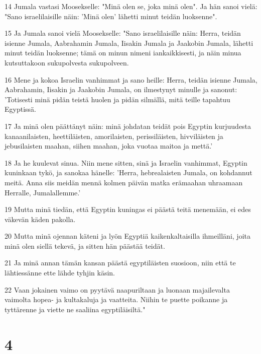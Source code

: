 \par 14 Jumala vastasi Moosekselle: "Minä olen se, joka minä olen". Ja hän sanoi vielä: "Sano israelilaisille näin: 'Minä olen' lähetti minut teidän luoksenne".
\par 15 Ja Jumala sanoi vielä Moosekselle: "Sano israelilaisille näin: Herra, teidän isienne Jumala, Aabrahamin Jumala, Iisakin Jumala ja Jaakobin Jumala, lähetti minut teidän luoksenne; tämä on minun nimeni iankaikkisesti, ja näin minua kutsuttakoon sukupolvesta sukupolveen.
\par 16 Mene ja kokoa Israelin vanhimmat ja sano heille: Herra, teidän isienne Jumala, Aabrahamin, Iisakin ja Jaakobin Jumala, on ilmestynyt minulle ja sanonut: 'Totisesti minä pidän teistä huolen ja pidän silmällä, mitä teille tapahtuu Egyptissä.
\par 17 Ja minä olen päättänyt näin: minä johdatan teidät pois Egyptin kurjuudesta kanaanilaisten, heettiläisten, amorilaisten, perissiläisten, hivviläisten ja jebusilaisten maahan, siihen maahan, joka vuotaa maitoa ja mettä.'
\par 18 Ja he kuulevat sinua. Niin mene sitten, sinä ja Israelin vanhimmat, Egyptin kuninkaan tykö, ja sanokaa hänelle: 'Herra, hebrealaisten Jumala, on kohdannut meitä. Anna siis meidän mennä kolmen päivän matka erämaahan uhraamaan Herralle, Jumalallemme.'
\par 19 Mutta minä tiedän, että Egyptin kuningas ei päästä teitä menemään, ei edes väkevän käden pakolla.
\par 20 Mutta minä ojennan käteni ja lyön Egyptiä kaikenkaltaisilla ihmeilläni, joita minä olen siellä tekevä, ja sitten hän päästää teidät.
\par 21 Ja minä annan tämän kansan päästä egyptiläisten suosioon, niin että te lähtiessänne ette lähde tyhjin käsin.
\par 22 Vaan jokainen vaimo on pyytävä naapuriltaan ja luonaan majailevalta vaimolta hopea- ja kultakaluja ja vaatteita. Niihin te puette poikanne ja tyttärenne ja viette ne saaliina egyptiläisiltä."

\chapter{4}

